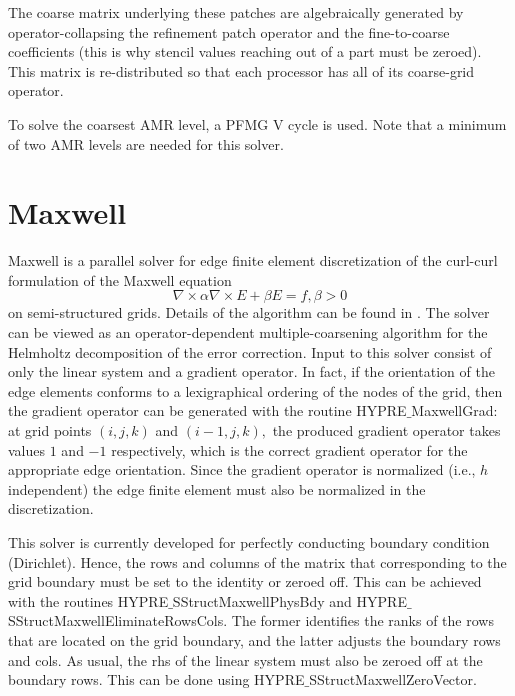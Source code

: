 The coarse matrix underlying these patches are algebraically generated by operator-collapsing the 
refinement patch operator and the fine-to-coarse coefficients (this is why stencil values reaching
out of a part must be zeroed). This matrix is re-distributed so that each processor has all of its
coarse-grid operator.

To solve the coarsest AMR level, a PFMG V cycle is used. Note that a minimum of two AMR levels
are needed for this solver.


\section{Maxwell}

Maxwell is a parallel solver for edge finite element discretization of the
curl-curl formulation of the Maxwell equation
\[ \nabla \times \alpha \nabla \times E + \beta E= f, \beta> 0\]
on semi-structured grids. Details of the algorithm can be found in \cite{JonesLee_2006}.
The solver can be viewed as an operator-dependent multiple-coarsening algorithm for the Helmholtz
decomposition of the error correction. Input to this solver consist of only the linear system
and a gradient operator. In fact, if the orientation of the edge elements conforms to
a lexigraphical ordering of the nodes of the grid, then the gradient operator can be generated
with the routine HYPRE$\_$MaxwellGrad: at grid points $(i,j,k)$ and $(i-1,j,k),$
the produced gradient operator takes values $1$ and $-1$ respectively, which
is the correct gradient operator for the appropriate edge orientation. Since the gradient operator
is normalized (i.e., $h$ independent) the edge finite element must also be normalized in the
discretization.

This solver is currently developed for perfectly conducting boundary condition (Dirichlet). Hence, the
rows and columns of the matrix that corresponding to the grid boundary must be set to the identity or
zeroed off. This can be achieved with the routines HYPRE$\_$SStructMaxwellPhysBdy and 
HYPRE$\_$SStructMaxwellEliminateRowsCols. The former identifies the ranks of the rows that are located on
the grid boundary, and the latter adjusts the boundary rows and cols. As usual, the rhs of the linear system
must also be zeroed off at the boundary rows. This can be done using HYPRE$\_$SStructMaxwellZeroVector.

